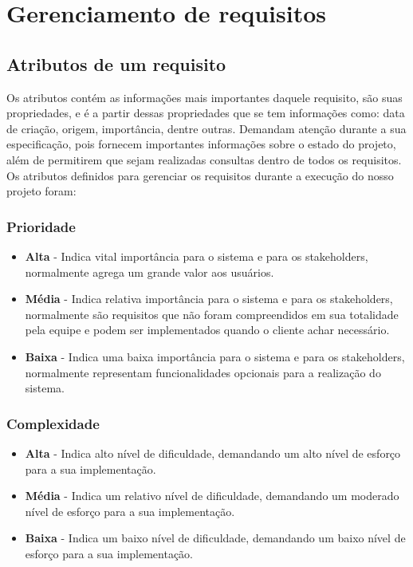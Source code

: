 \chapter[Gerenciamento de requisitos]{Gerenciamento de requisitos}
\section{Atributos de um requisito}
Os atributos contém as informações mais importantes daquele requisito, são suas propriedades, e é a partir dessas propriedades que se tem informações como: data de criação, origem, importância, dentre outras. Demandam atenção durante a sua especificação, pois fornecem importantes informações sobre o estado do projeto, além de permitirem que sejam realizadas consultas dentro de todos os requisitos.
Os atributos definidos para gerenciar os requisitos durante a execução do nosso projeto foram:
\subsection{Prioridade}
\begin{itemize}
\item \textbf{Alta} - Indica vital importância para o sistema e para os stakeholders, normalmente agrega um grande valor aos usuários.
\item \textbf{Média} - Indica relativa importância para o sistema e para os stakeholders, normalmente são requisitos que não foram compreendidos em sua totalidade pela equipe e podem ser implementados quando o cliente achar necessário.
\item \textbf{Baixa} - Indica uma baixa importância para o sistema e para os stakeholders, normalmente representam funcionalidades opcionais para a realização do sistema.
\end{itemize}
\subsection{Complexidade}
\begin{itemize}
\item \textbf{Alta} - Indica alto nível de dificuldade, demandando um alto nível de esforço para a sua implementação.
\item \textbf{Média} - Indica um relativo nível de dificuldade, demandando um moderado nível de esforço para a sua implementação.
\item \textbf{Baixa} - Indica um baixo nível de dificuldade, demandando um baixo nível de esforço para a sua implementação.
\end{itemize}

